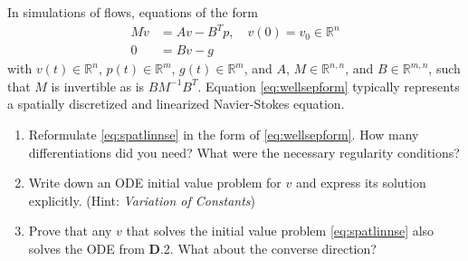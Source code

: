 \documentclass[a4paper,10pt]{article}
\begin{document}
In simulations of flows, equations of the form 
\begin{subequations}
	\label{eq:spatlinnse}
	\begin{align}
		M \dot v &= Av - B^Tp, \quad v(0)=v_0\in \mathbb R^{n} \\
		0 &= Bv-g
	\end{align}
\end{subequations}
with $v(t) \in \mathbb R^{n}$, $p(t) \in \mathbb R^{m}$, $g(t)\in\mathbb R^{m}$, and $A$, $M \in \mathbb R^{n,n}$, and $B\in \mathbb R^{m,n}$, such that $M$ is invertible as is $BM^{-1}B^T$. Equation \eqref{eq:wellsepform} typically represents a spatially discretized and linearized Navier-Stokes equation.
\begin{enumerate}
	\item Reformulate \eqref{eq:spatlinnse} in the form of \eqref{eq:wellsepform}. How many differentiations did you need? What were the necessary regularity conditions?
	\item Write down an ODE initial value problem for $v$ and express its solution explicitly. (Hint: \emph{Variation of Constants})
	\item Prove that any $v$ that solves the initial value problem \eqref{eq:spatlinnse} also solves the ODE from {\bf D}.2. What about the converse direction?
\end{enumerate}
\smallskip
\end{document}
